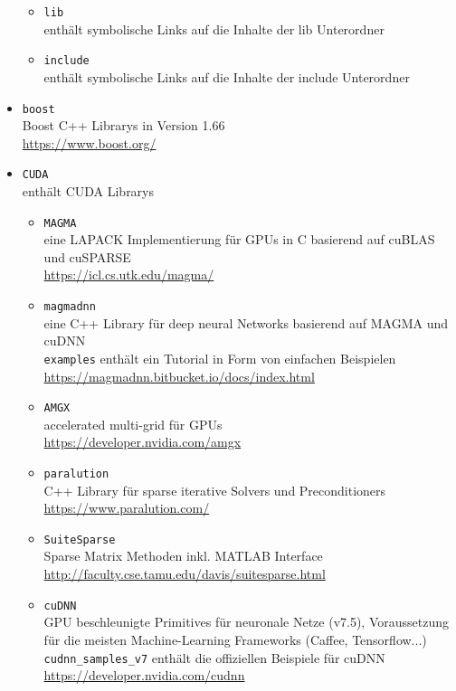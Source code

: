 \documentclass[headsepline=3pt,headinclude=true,12pt,oneside]{scrartcl}
\let\li=\lstinline
\begin{document}
\begin{itemize}
\begin{itemize}
			\item \li`lib` \\       
			enthält symbolische Links auf die Inhalte der lib Unterordner
			
			\item \li`include` \\  
			enthält symbolische Links auf die Inhalte der include Unterordner
		\end{itemize}
		
		\item \li`boost` \\ 
		Boost C++ Librarys in Version 1.66 \\
		\url{https://www.boost.org/}  
		
		\item \li`CUDA` \\
		enthält CUDA Librarys
		\begin{itemize} 		
			\item \li`MAGMA` \\
			eine LAPACK Implementierung für GPUs in C basierend auf cuBLAS und cuSPARSE \\
			\url{https://icl.cs.utk.edu/magma/}
			   
			\item \li`magmadnn` \\
			eine C++ Library für deep neural Networks basierend auf MAGMA und cuDNN \\
			\li`examples` enthält ein Tutorial in Form von einfachen Beispielen \\
			\url{https://magmadnn.bitbucket.io/docs/index.html}
			
			\item \li`AMGX` \\
			accelerated multi-grid für GPUs \\
			\url{https://developer.nvidia.com/amgx}
\newpage			
			\item \li`paralution` \\
			C++ Library für sparse iterative Solvers und Preconditioners \\
			\url{https://www.paralution.com/} 
			
			\item \li`SuiteSparse` \\ 
			Sparse Matrix Methoden inkl. MATLAB Interface \\
			\url{http://faculty.cse.tamu.edu/davis/suitesparse.html}
		
			\item \li`cuDNN` \\
			GPU beschleunigte Primitives für neuronale Netze (v7.5), Voraussetzung für die meisten Machine-Learning Frameworks (Caffee, Tensorflow...) \\
			\li`cudnn_samples_v7` enthält die offiziellen Beispiele für cuDNN \\
			\url{https://developer.nvidia.com/cudnn}
			

\end{itemize}
\end{itemize}
\end{document}
